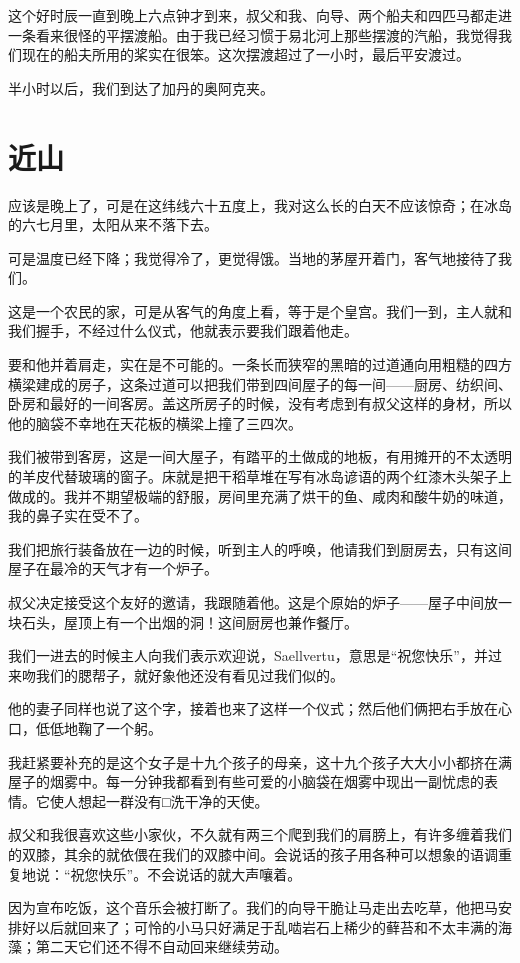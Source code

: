 \documentclass[10pt]{book}
\begin{document}
这个好时辰一直到晚上六点钟才到来，叔父和我、向导、两个船夫和四匹马都走进一条看来很怪的平摆渡船。由于我已经习惯于易北河上那些摆渡的汽船，我觉得我们现在的船夫所用的桨实在很笨。这次摆渡超过了一小时，最后平安渡过。

半小时以后，我们到达了加丹的奥阿克夹。
\chapter{近山}
应该是晚上了，可是在这纬线六十五度上，我对这么长的白天不应该惊奇；在冰岛的六七月里，太阳从来不落下去。

可是温度已经下降；我觉得冷了，更觉得饿。当地的茅屋开着门，客气地接待了我们。

这是一个农民的家，可是从客气的角度上看，等于是个皇宫。我们一到，主人就和我们握手，不经过什么仪式，他就表示要我们跟着他走。

要和他并着肩走，实在是不可能的。一条长而狭窄的黑暗的过道通向用粗糙的四方横梁建成的房子，这条过道可以把我们带到四间屋子的每一间——厨房、纺织间、卧房和最好的一间客房。盖这所房子的时候，没有考虑到有叔父这样的身材，所以他的脑袋不幸地在天花板的横梁上撞了三四次。

我们被带到客房，这是一间大屋子，有踏平的土做成的地板，有用摊开的不太透明的羊皮代替玻璃的窗子。床就是把干稻草堆在写有冰岛谚语的两个红漆木头架子上做成的。我并不期望极端的舒服，房间里充满了烘干的鱼、咸肉和酸牛奶的味道，我的鼻子实在受不了。

我们把旅行装备放在一边的时候，听到主人的呼唤，他请我们到厨房去，只有这间屋子在最冷的天气才有一个炉子。

叔父决定接受这个友好的邀请，我跟随着他。这是个原始的炉子——屋子中间放一块石头，屋顶上有一个出烟的洞！这间厨房也兼作餐厅。

我们一进去的时候主人向我们表示欢迎说，Saellvertu，意思是“祝您快乐”，并过来吻我们的腮帮子，就好象他还没有看见过我们似的。

他的妻子同样也说了这个字，接着也来了这样一个仪式；然后他们俩把右手放在心口，低低地鞠了一个躬。

我赶紧要补充的是这个女子是十九个孩子的母亲，这十九个孩子大大小小都挤在满屋子的烟雾中。每一分钟我都看到有些可爱的小脑袋在烟雾中现出一副忧虑的表情。它使人想起一群没有□洗干净的天使。

叔父和我很喜欢这些小家伙，不久就有两三个爬到我们的肩膀上，有许多缠着我们的双膝，其余的就依偎在我们的双膝中间。会说话的孩子用各种可以想象的语调重复地说：“祝您快乐”。不会说话的就大声嚷着。

因为宣布吃饭，这个音乐会被打断了。我们的向导干脆让马走出去吃草，他把马安排好以后就回来了；可怜的小马只好满足于乱啮岩石上稀少的藓苔和不太丰满的海藻；第二天它们还不得不自动回来继续劳动。
\end{document}
